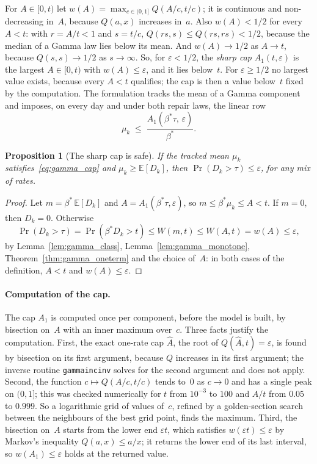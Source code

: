 \documentclass[11pt,a4paper]{article}
\theoremstyle{plain}
\newtheorem{proposition}[theorem]{Proposition}
\theoremstyle{definition}
\theoremstyle{remark}
\begin{document}
For $A \in [0, t)$ let $w(A) = \max_{c \in (0,1]} Q(A/c, t/c)$; it is continuous and non-decreasing in~$A$, because $Q(a, x)$ increases in~$a$.
Also $w(A) < 1/2$ for every $A < t$: with $r = A/t < 1$ and $s = t/c$, $Q(rs, s) \le Q(rs, rs) < 1/2$, because the median of a Gamma law lies below its mean.
And $w(A) \to 1/2$ as $A \to t$, because $Q(s, s) \to 1/2$ as $s \to \infty$.
So, for $\varepsilon < 1/2$, the \emph{sharp cap} $A_1(t,\varepsilon)$ is the largest $A \in [0, t)$ with $w(A) \le \varepsilon$, and it lies below~$t$.
For $\varepsilon \ge 1/2$ no largest value exists, because every $A < t$ qualifies; the cap is then a value below~$t$ fixed by the computation.
The formulation tracks the mean of a Gamma component and imposes, on every day and under both repair laws, the linear row
\begin{equation}\label{eq:gamma_cap}
  \mu_k \;\le\; \frac{A_1(\beta^*\tau,\, \varepsilon)}{\beta^*}.
\end{equation}

\begin{proposition}[The sharp cap is safe]\label{prop:gamma_safe}
If the tracked mean $\mu_k$ satisfies~\eqref{eq:gamma_cap} and $\mu_k \ge \mathbb{E}[D_k]$, then $\Pr(D_k > \tau) \le \varepsilon$, for any mix of rates.
\end{proposition}
\begin{proof}
Let $m = \beta^*\,\mathbb{E}[D_k]$ and $A = A_1(\beta^*\tau, \varepsilon)$, so $m \le \beta^*\mu_k \le A < t$.
If $m = 0$, then $D_k = 0$.
Otherwise
\[
  \Pr(D_k > \tau) = \Pr(\beta^* D_k > t) \le W(m, t) \le W(A, t) = w(A) \le \varepsilon,
\]
by Lemma~\ref{lem:gamma_class}, Lemma~\ref{lem:gamma_monotone}, Theorem~\ref{thm:gamma_oneterm} and the choice of~$A$: in both cases of the definition, $A < t$ and $w(A) \le \varepsilon$.
\end{proof}

\paragraph{Computation of the cap.}
The cap $A_1$ is computed once per component, before the model is built, by bisection on~$A$ with an inner maximum over~$c$.
Three facts justify the computation.
First, the exact one-rate cap $\hat A$, the root of $Q(\hat A, t) = \varepsilon$, is found by bisection on its first argument, because $Q$ increases in its first argument; the inverse routine \texttt{gammaincinv} solves for the second argument and does not apply.
Second, the function $c \mapsto Q(A/c, t/c)$ tends to~$0$ as $c \to 0$ and has a single peak on $(0, 1]$; this was checked numerically for $t$ from $10^{-3}$ to $100$ and $A/t$ from $0.05$ to $0.999$.
So a logarithmic grid of values of~$c$, refined by a golden-section search between the neighbours of the best grid point, finds the maximum.
Third, the bisection on~$A$ starts from the lower end $\varepsilon t$, which satisfies $w(\varepsilon t) \le \varepsilon$ by Markov's inequality $Q(a, x) \le a/x$; it returns the lower end of its last interval, so $w(A_1) \le \varepsilon$ holds at the returned value.
\end{document}
